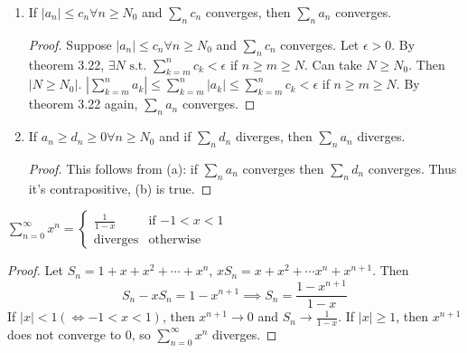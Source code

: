 \begin{theorem}
	\label{thm:3.25}
	\begin{enumerate}[label=(\alph*)]
		\item If $|a_{n}| \le c_n \forall n\ge N_0$ and $\sum_{n}{c_{n}}$ converges, then $\sum_{n}{a_{n}}$ converges.
		      \begin{proof}
			      Suppose $|a_{n}|\le c_{n} \forall n\ge N_0$ and $\sum_{n}^{}{c_{n}}$ converges. Let $\epsilon>0$. By theorem 3.22, $\exists N \text{ s.t. } \sum_{k=m}^{n}{c_{k}}< \epsilon $ if $n\ge m\ge N$. Can take $N\ge N_0$. Then $|N\ge N_0|$. $|\sum_{k=m}^{n}{a_{k}}|\le \sum_{k=m}^{n}{|a_{k}|}\le \sum_{k=m}^{n}{c_k}<\epsilon$ if $n\ge m\ge N$. By theorem 3.22 again, $\sum_{n}{a_{n}}$ converges.
		      \end{proof}
		\item If $a_{n}\ge d_{n}\ge 0 \forall n\ge N_0$ and if $\sum_{n}{d_n}$ diverges, then $\sum_{n}{a_{n}}$ diverges.
		      \begin{proof}
			      This follows from (a): if $\sum_{n}{a_{n}}$ converges then $\sum_{n}{d_{n}}$ converges. Thus it's contrapositive, (b) is true.
		      \end{proof}
	\end{enumerate}
\end{theorem}

\begin{theorem}
	\label{thm:3.26}
	$\sum_{n=0}^{\infty }{x^{n}}=
		\begin{cases}
			\frac{1}{1-x}   & \text{if $-1<x<1$} \\
			\text{diverges} & \text{otherwise}
		\end{cases}
	$
	\begin{proof}
		Let $S_n=1+x+x^2+\cdots +x^{n}$, $xS_n= x + x^2+ \cdots x^{n}+x^{n+1}$. Then
		\[
			S_n-xS_n=1-x^{n+1} \implies S_n=\frac{1-x^{n+1}}{1-x}
		\]
		If $|x|<1 (\Leftrightarrow -1<x<1)$, then $x^{n+1}\to 0$ and $S_n\to \frac{1}{1-x}$. If $|x|\ge 1$, then $x^{n+1}$ does not converge to 0, so $\sum_{n=0}^{\infty}{x^{n}}$ diverges.
	\end{proof}
\end{theorem}



